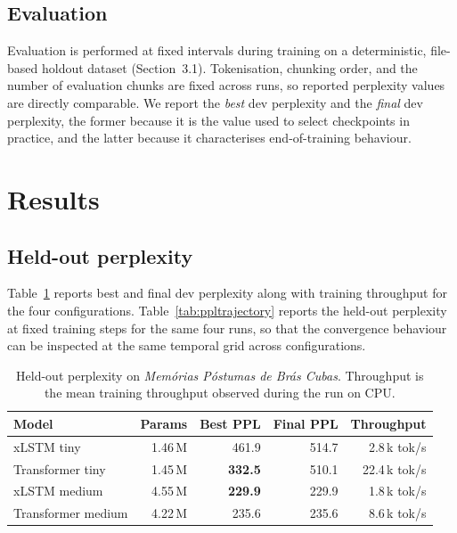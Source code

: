 \documentclass[11pt]{article}
\begin{document}
\subsection{Evaluation}

Evaluation is performed at fixed intervals during training on a
deterministic, file-based holdout dataset (Section~3.1). Tokenisation,
chunking order, and the number of evaluation chunks are fixed across
runs, so reported perplexity values are directly comparable. We report
the \emph{best} dev perplexity and the \emph{final} dev perplexity, the
former because it is the value used to select checkpoints in practice,
and the latter because it characterises end-of-training behaviour.

\section{Results}

\subsection{Held-out perplexity}\label{sec:held-out-ppl}

Table~\ref{tab:results} reports best and final dev perplexity along with
training throughput for the four configurations.
Table~\ref{tab:ppltrajectory} reports the held-out perplexity at fixed
training steps for the same four runs, so that the convergence behaviour
can be inspected at the same temporal grid across configurations.

\begin{table}[h]
\centering
\caption{Held-out perplexity on \emph{Memórias Póstumas de Brás Cubas}.
  Throughput is the mean training throughput observed during the run on
  CPU.}
\label{tab:results}
\small
\begin{tabular}{lrrrr}
\toprule
Model & Params & Best PPL & Final PPL & Throughput \\
\midrule
xLSTM tiny         & 1.46\,M & 461.9 & 514.7 & 2.8\,k tok/s \\
Transformer tiny   & 1.45\,M & \textbf{332.5} & 510.1 & 22.4\,k tok/s \\
xLSTM medium       & 4.55\,M & \textbf{229.9} & 229.9 & 1.8\,k tok/s \\
Transformer medium & 4.22\,M & 235.6 & 235.6 & 8.6\,k tok/s \\
\bottomrule
\end{tabular}
\end{table}
\end{document}

